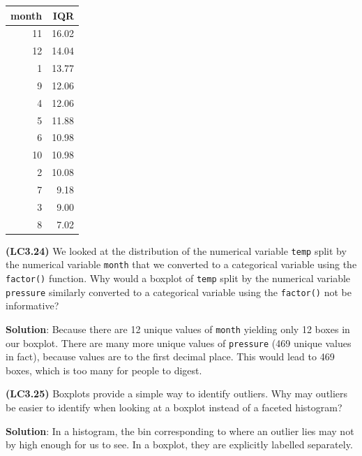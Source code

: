 \documentclass[12pt, krantz2,]{krantz}
\makeatletter
\newenvironment{Shaded}{\begin{snugshade}}{\end{snugshade}}
\newcommand{\DataTypeTok}[1]{\textcolor[rgb]{0.27,0.27,0.27}{#1}}
\newcommand{\KeywordTok}[1]{\textcolor[rgb]{0.27,0.27,0.27}{\textbf{#1}}}
\newcommand{\NormalTok}[1]{#1}
\newcommand{\OperatorTok}[1]{\textcolor[rgb]{0.43,0.43,0.43}{\textbf{#1}}}
\newcommand{\OtherTok}[1]{\textcolor[rgb]{0.37,0.37,0.37}{#1}}
\newcommand{\StringTok}[1]{\textcolor[rgb]{0.5,0.5,0.5}{#1}}
\newenvironment{kframe}{%
\medskip{}
\setlength{\fboxsep}{.8em}
 \def\at@end@of@kframe{}%
 \ifinner\ifhmode%
  \def\at@end@of@kframe{\end{minipage}}%
  \begin{minipage}{\columnwidth}%
 \fi\fi%
 \def\FrameCommand##1{\hskip\@totalleftmargin \hskip-\fboxsep
 \colorbox{shadecolor}{##1}\hskip-\fboxsep
     \hskip-\linewidth \hskip-\@totalleftmargin \hskip\columnwidth}%
 \MakeFramed {\advance\hsize-\width
   \@totalleftmargin\z@ \linewidth\hsize
   \@setminipage}}%
 {\par\unskip\endMakeFramed%
 \at@end@of@kframe}
\renewenvironment{Shaded}{\begin{kframe}}{\end{kframe}}
\makeatother
\begin{document}
\begin{Shaded}
\end{Shaded}

\begin{tabular}{r|r}
\hline
month & IQR\\
\hline
11 & 16.02\\
\hline
12 & 14.04\\
\hline
1 & 13.77\\
\hline
9 & 12.06\\
\hline
4 & 12.06\\
\hline
5 & 11.88\\
\hline
6 & 10.98\\
\hline
10 & 10.98\\
\hline
2 & 10.08\\
\hline
7 & 9.18\\
\hline
3 & 9.00\\
\hline
8 & 7.02\\
\hline
\end{tabular}

\textbf{(LC3.24)} We looked at the distribution of the numerical variable \texttt{temp} split by the numerical variable \texttt{month} that we converted to a categorical variable using the \texttt{factor()} function. Why would a boxplot of \texttt{temp} split by the numerical variable \texttt{pressure} similarly converted to a categorical variable using the \texttt{factor()} not be informative?

\textbf{Solution}: Because there are 12 unique values of \texttt{month} yielding only 12 boxes in our boxplot. There are many more unique values of \texttt{pressure} (469 unique values in fact), because values are to the first decimal place. This would lead to 469 boxes, which is too many for people to digest.

\textbf{(LC3.25)} Boxplots provide a simple way to identify outliers. Why may outliers be easier to identify when looking at a boxplot instead of a faceted histogram?

\textbf{Solution}: In a histogram, the bin corresponding to where an outlier lies may not by high enough for us to see. In a boxplot, they are explicitly labelled separately.
\end{document}
